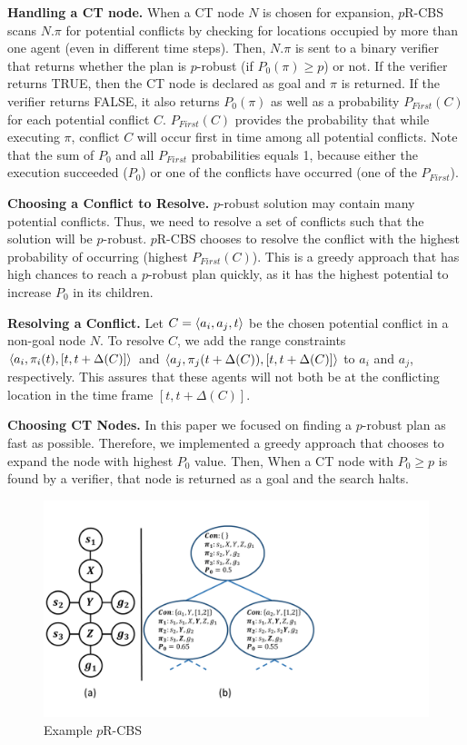 \documentclass{article}
\newcommand{\prcbs}{$p$R-CBS\xspace}
\begin{document}
{\bf Handling a CT node.} When a CT node $N$ is chosen for expansion, \prcbs{} scans $N.\pi$ for potential conflicts by checking for locations occupied by more than one agent (even in different time steps). Then, $N.\pi$ is sent to a binary verifier that returns whether the plan is $p$-robust (if $P_0(\pi) \geq p$) or not. If the verifier returns TRUE, then the CT node is declared as goal and $\pi$ is returned. If the verifier returns FALSE, it also returns $P_0(\pi)$ as well as a probability $P_{First}(C)$ for each potential conflict $C$. $P_{First}(C)$ provides the probability that while executing $\pi$, conflict $C$ will occur first in time among all potential conflicts. Note that the sum of $P_0$ and all $P_{First}$ probabilities equals 1, because either the execution succeeded ($P_0$) or one of the conflicts have occurred (one of the $P_{First}$). 


{\bf Choosing a Conflict to Resolve.} $p$-robust solution may contain many potential conflicts. Thus, we need to resolve a set of conflicts such that the solution will be $p$-robust. \prcbs{} chooses to resolve the conflict with the highest probability of occurring (highest $P_{First}(C)$). This is a greedy approach that has high chances to reach a $p$-robust plan quickly, as it has the highest potential to increase $P_0$ in its children. 

{\bf Resolving a Conflict.} Let $C=\left \langle a_i,a_j,t \right \rangle $ be the chosen potential conflict in a non-goal node $N$. To resolve $C$, we add the range constraints
$\left \langle a_i, \pi_i(t), [t, t+\Delta(C)] \right \rangle $ and $\left \langle a_j, \pi_j(t+\Delta(C)), [t, t+\Delta(C)] \right \rangle $ to $a_i$ and $a_j$, respectively. This assures that these agents will not both be at the conflicting location in the time frame $[t,t+\Delta(C)]$.

{\bf Choosing CT Nodes.} In this paper we focused on finding a $p$-robust plan as fast as possible. Therefore, we implemented a greedy approach that chooses to expand the node with highest $P_0$ value. Then,  When a CT node with $P_0\geq p$ is found by a verifier, that node is returned as a goal and the search halts. 


\begin{figure}[t]
	\centering
	\includegraphics[width=0.7\columnwidth]{Pics/cropped_probust_example.pdf}
	\caption{Example \prcbs{}}
	\vspace{-0.3cm}
	\label{fig:conflicts_example}%
\end{figure}
\end{document}
